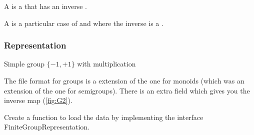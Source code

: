 
A \Group is a \Monoid that has an inverse \Mapping.


A \FiniteGroup is a particular case of \Group and \FiniteMonoid where the inverse is a \FiniteMap.


\subsubsection*{Representation}

\begin{marginfigure}%
    \caption{Simple group $\{-1,+1\}$ with multiplication}%
    \label{fig:G2}%
\end{marginfigure}%

The file format for groups is a extension of the one for monoids (which was an extension of the one for semigroups).
There is an extra field  which gives you the inverse map (\cref{fig:G2}).

\begin{codeexercise}
    Create a function to load the data by implementing the interface FiniteGroupRepresentation.
\end{codeexercise}


